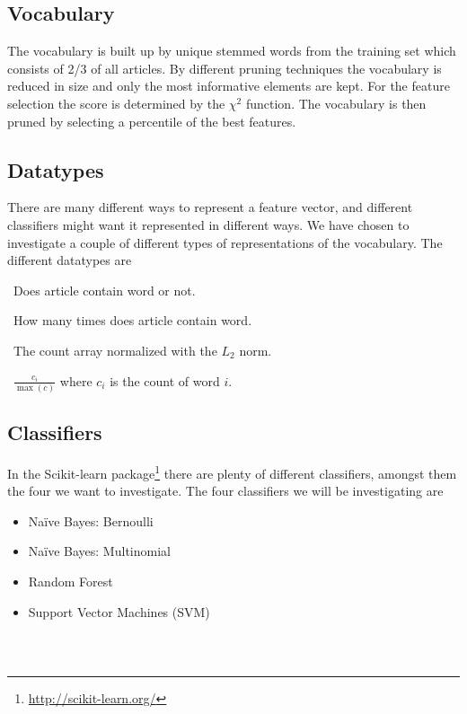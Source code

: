 \subsection{Vocabulary}
The vocabulary is built up by unique stemmed words from the training set which consists of 2/3 of all articles. By different pruning techniques the vocabulary is reduced in size and only the most informative elements are kept. For the feature selection the score is determined by the $\chi^2$ function. The vocabulary is then pruned by selecting a percentile of the best features.
\subsection{Datatypes}
There are many different ways to represent a feature vector, and different classifiers might want it represented in different ways. We have chosen to investigate a couple of different types of representations of the vocabulary. The different datatypes are
\begin{description}[noitemsep,labelindent=0.5cm]
\small
\item[Binary:]\ Does article contain word or not.
\item[Count:]\ How many times does article contain word.
\item[$L_2$-normalized:]\ The count array normalized with the $L_2$ norm. 
\item[Mapped value from 0 to 1:]\ $\frac{c_i}{\max(c)}$ where $c_i$ is the count of word $i$.
\end{description}

\subsection{Classifiers}
In the Scikit-learn package\footnote{\label{ftn:scikit}\url{http://scikit-learn.org/}} there are plenty of different classifiers, amongst them the four we want to investigate. The four classifiers we will be investigating are
\begin{itemize}[noitemsep,nolistsep]
\item Naïve Bayes: Bernoulli
\item Naïve Bayes: Multinomial
\item Random Forest 
\item Support Vector Machines (SVM)
\end{itemize}

\subsubsection{\bn\ \nb} %
\label{ssub:bernoulli}

